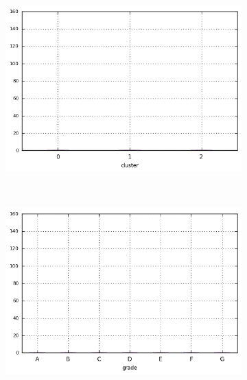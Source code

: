 \begin{anexosenv}
\begin{figure}[ht!]
\begin{subfigure}[t]{0.45\textwidth}
        \end{subfigure}
\end{figure}



\begin{figure}[ht!]
    \centering
        \caption{\emph{Boxplots} de total\textunderscore rec\textunderscore late\textunderscore fee }
        \begin{subfigure}[t]{0.45\textwidth}
            \centering

            \centerline{\includegraphics[width=1\textwidth]{img/total_rec_late_fee_by_cluster}}
        \end{subfigure}%
        ~ 
        \begin{subfigure}[t]{0.45\textwidth}
            \centering
   
            \centerline{\includegraphics[width=1\textwidth]{img/total_rec_late_fee_by_grade}}


\end{subfigure}
\end{figure}
\end{anexosenv}
